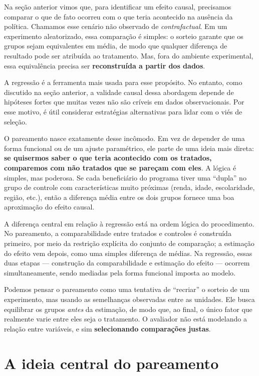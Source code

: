Na seção anterior vimos que, para identificar um efeito causal, precisamos comparar o que de fato ocorreu com o que teria acontecido na ausência da política. Chamamos esse cenário não observado de \emph{contrafactual}. Em um experimento aleatorizado, essa comparação é simples: o sorteio garante que os grupos sejam equivalentes em média, de modo que qualquer diferença de resultado pode ser atribuída ao tratamento. Mas, fora do ambiente experimental, essa equivalência precisa ser \textbf{reconstruída a partir dos dados}.

A regressão é a ferramenta mais usada para esse propósito. No entanto, como discutido na seção anterior, a validade causal dessa abordagem depende de hipóteses fortes que muitas vezes não são críveis em dados observacionais. Por esse motivo, é útil considerar estratégias alternativas para lidar com o viés de seleção.

O pareamento nasce exatamente desse incômodo. Em vez de depender de uma forma funcional ou de um ajuste paramétrico, ele parte de uma ideia mais direta: \textbf{se quisermos saber o que teria acontecido com os tratados, comparemos com não tratados que se pareçam com eles}. A lógica é simples, mas poderosa. Se cada beneficiário do programa tiver uma ``dupla'' no grupo de controle com características muito próximas (renda, idade, escolaridade, região, etc.), então a diferença média entre os dois grupos fornece uma boa aproximação do efeito causal.

A diferença central em relação à regressão está na ordem lógica do procedimento. No pareamento, a comparabilidade entre tratados e controles é construída primeiro, por meio da restrição explícita do conjunto de comparação; a estimação do efeito vem depois, como uma simples diferença de médias. Na regressão, essas duas etapas --- construção da comparabilidade e estimação do efeito --- ocorrem simultaneamente, sendo mediadas pela forma funcional imposta ao modelo.


Podemos pensar o pareamento como uma tentativa de “recriar” o sorteio de um experimento, mas usando as semelhanças observadas entre as unidades. Ele busca equilibrar os grupos \emph{antes} da estimação, de modo que, ao final, o único fator que realmente varie entre eles seja o tratamento. O avaliador não está modelando a relação entre variáveis, e sim \textbf{selecionando comparações justas}.

\section{A ideia central do pareamento}

